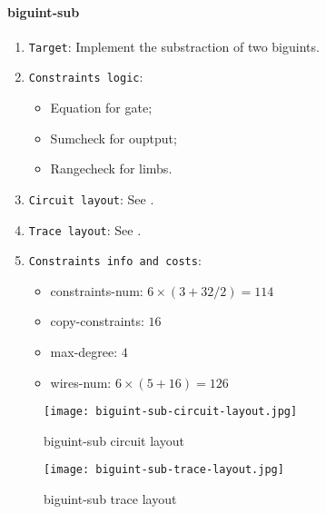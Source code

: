 \paragraph{biguint-sub}

\begin{enumerate}
    \item \verb|Target|: Implement the substraction of two biguints.
    \item \verb|Constraints logic|:
    \begin{itemize}
        \item Equation for gate;
        \item Sumcheck for ouptput;
        \item Rangecheck for limbs.
    \end{itemize}
    \item \verb|Circuit layout|: See .
    \item \verb|Trace layout|: See .
    \item \verb|Constraints info and costs|:
    \begin{itemize}
        \item constraints-num: $6 \times (3 + 32 / 2) = 114$
        \item copy-constraints: $16$
        \item max-degree: $4$
        \item wires-num: $6 \times (5 + 16) = 126$
    \end{itemize}
\end{enumerate}

\begin{figure}[!ht]
    \centering
    \texttt{[image: biguint-sub-circuit-layout.jpg]}
    \caption{biguint-sub circuit layout}
    \label{fig:biguint-sub-circuit-layout}
\end{figure}

\begin{figure}[!ht]
    \centering
    \texttt{[image: biguint-sub-trace-layout.jpg]}
    \caption{biguint-sub trace layout}
    \label{fig:biguint-sub-trace-layout}
\end{figure}